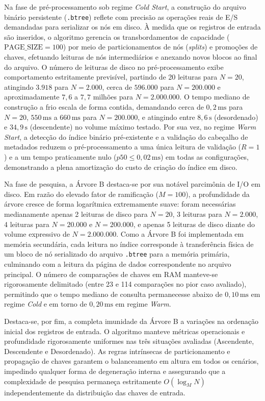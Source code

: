 \documentclass[12pt,a4paper]{article}
\begin{document}
Na fase de pré-processamento sob regime \textit{Cold Start}, a construção do arquivo binário persistente (\texttt{.btree}) reflete com precisão as operações reais de E/S demandadas para serializar os nós em disco. À medida que os registros de entrada são inseridos, o algoritmo gerencia os transbordamentos de capacidade ($\text{PAGE\_SIZE} = 100$) por meio de particionamentos de nós (\textit{splits}) e promoções de chaves, efetuando leituras de nós intermediários e anexando novos blocos ao final do arquivo. O número de leituras de disco no pré-processamento exibe comportamento estritamente previsível, partindo de 20 leituras para $N = 20$, atingindo $3.918$ para $N = 2.000$, cerca de $596.000$ para $N = 200.000$ e aproximadamente $7{,}6$ a $7{,}7$ milhões para $N = 2.000.000$. O tempo mediano de construção a frio escala de forma contida, demandando cerca de $0{,}2\,\text{ms}$ para $N=20$, $550\,\text{ms}$ a $660\,\text{ms}$ para $N=200.000$, e atingindo entre $8{,}6\,\text{s}$ (desordenado) e $34{,}9\,\text{s}$ (descendente) no volume máximo testado. Por sua vez, no regime \textit{Warm Start}, a detecção do índice binário pré-existente e a validação do cabeçalho de metadados reduzem o pré-processamento a uma única leitura de validação ($R = 1$) e a um tempo praticamente nulo ($p50 \le 0{,}02\,\text{ms}$) em todas as configurações, demonstrando a plena amortização do custo de criação do índice em disco.

Na fase de pesquisa, a Árvore B destaca-se por sua notável parcimônia de I/O em disco. Em razão do elevado fator de ramificação ($M = 100$), a profundidade da árvore cresce de forma logarítmica extremamente suave: foram necessárias medianamente apenas 2 leituras de disco para $N = 20$, 3 leituras para $N = 2.000$, 4 leituras para $N = 20.000$ e $N = 200.000$, e apenas 5 leituras de disco diante do volume expressivo de $N = 2.000.000$. Como a Árvore B foi implementada em memória secundária, cada leitura no índice corresponde à transferência física de um bloco de nó serializado do arquivo \texttt{.btree} para a memória primária, culminando com a leitura da página de dados correspondente no arquivo principal. O número de comparações de chaves em RAM manteve-se rigorosamente delimitado (entre 23 e 114 comparações no pior caso avaliado), permitindo que o tempo mediano de consulta permanecesse abaixo de $0{,}10\,\text{ms}$ em regime \textit{Cold} e em torno de $0{,}20\,\text{ms}$ em regime \textit{Warm}.

Destaca-se, por fim, a completa imunidade da Árvore B a variações na ordenação inicial dos registros de entrada. O algoritmo manteve métricas operacionais e profundidade rigorosamente uniformes nas três situações avaliadas (Ascendente, Descendente e Desordenado). As regras intrínsecas de particionamento e propagação de chaves garantem o balanceamento em altura em todos os cenários, impedindo qualquer forma de degeneração interna e assegurando que a complexidade de pesquisa permaneça estritamente $O(\log_M N)$ independentemente da distribuição das chaves de entrada.
\end{document}
